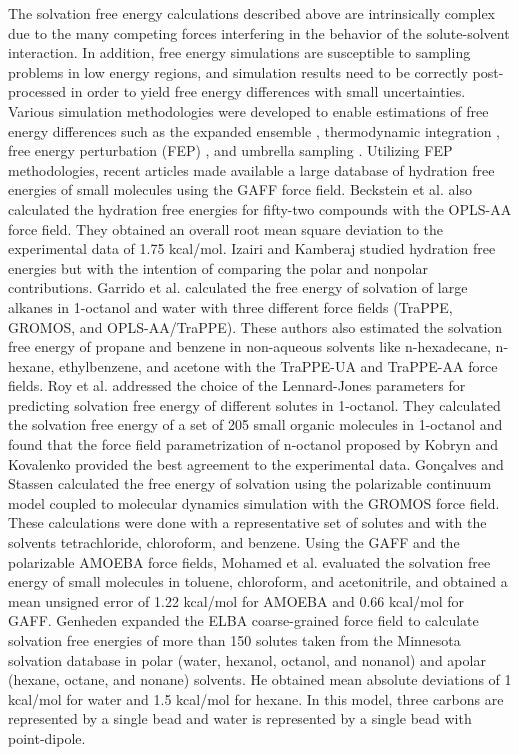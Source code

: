\documentclass[final,12p,times,twocolumn]{elsarticle}
\begin{document}
	The solvation free energy calculations described above are intrinsically complex due to the many competing forces interfering in the behavior of the solute-solvent interaction. In addition, free energy simulations are susceptible to sampling problems in low energy regions, and simulation results need to be correctly post-processed in order to yield free energy differences with small uncertainties. {Various simulation methodologies were developed to enable estimations of free energy differences} such as the expanded ensemble \cite{lyubartsev}, thermodynamic integration \cite{kirkwood1935}, free energy perturbation (FEP) \cite{zwanzig1954,bennet1976,mbar}, and umbrella sampling \cite{TORRIE1977187}.  Utilizing  FEP methodologies, recent articles \cite{PMID:24928188,mobley2017} made available a large database of hydration free energies of small molecules using the GAFF force field. Beckstein et al. \cite{Beckstein2014} also calculated the hydration free energies for fifty-two compounds with the OPLS-AA force field. They obtained an overall root mean square deviation to the experimental data of 1.75 kcal/mol. Izairi and Kamberaj \cite{izairi2017} studied hydration free energies but with the intention of comparing the polar and nonpolar contributions. Garrido et al. \cite{garrido,garrido2011} calculated the free energy of solvation of large alkanes in 1-octanol and water with three different force fields (TraPPE, GROMOS, and OPLS-AA/TraPPE). These authors also estimated the solvation free energy of propane and benzene in non-aqueous solvents like n-hexadecane, n-hexane, ethylbenzene, and acetone with the TraPPE-UA and TraPPE-AA force fields. Roy et al. \cite{roy2017}  addressed the choice of the Lennard-Jones parameters for predicting solvation free energy of different solutes in 1-octanol. They calculated the solvation free energy of a set of 205 small organic molecules in 1-octanol and found that the force field parametrization of n-octanol proposed by  Kobryn and Kovalenko \cite{doi:10.1063/1.2972978} provided the best agreement to the experimental data. Gon\c{c}alves and
	Stassen  \cite{goncalves} calculated the free energy of solvation using the polarizable continuum model coupled to molecular dynamics simulation with the GROMOS force field. These calculations were done with a representative set of solutes and with the solvents tetrachloride, chloroform, and benzene. Using the GAFF and the polarizable AMOEBA force fields, Mohamed et al.  \cite{mohamed2016} evaluated the solvation free energy of small molecules in toluene, chloroform, and acetonitrile, and obtained a mean unsigned error of 1.22 kcal/mol for AMOEBA and 0.66 kcal/mol for GAFF. Genheden \cite{doi:10.1021/acs.jctc.5b00963} expanded the ELBA coarse-grained force field to calculate solvation free energies of more than 150 solutes taken from the Minnesota solvation
	database in polar (water, hexanol, octanol, and nonanol) and apolar (hexane, octane, and nonane) solvents. He obtained mean absolute deviations of 1 kcal/mol for water and 1.5 kcal/mol for hexane. In this model, three carbons are represented by a single bead and water is represented by a single bead with point-dipole. 	
	
\end{document}
